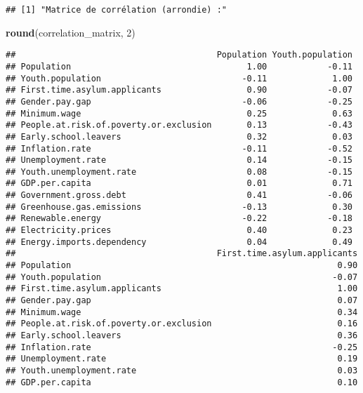 \documentclass[
]{article}
\newenvironment{Shaded}{\begin{snugshade}}{\end{snugshade}}
\newcommand{\DecValTok}[1]{\textcolor[rgb]{0.00,0.00,0.81}{#1}}
\newcommand{\FunctionTok}[1]{\textcolor[rgb]{0.13,0.29,0.53}{\textbf{#1}}}
\newcommand{\NormalTok}[1]{#1}
\begin{document}
\begin{verbatim}
## [1] "Matrice de corrélation (arrondie) :"
\end{verbatim}

\begin{Shaded}
\begin{Highlighting}[]
\FunctionTok{round}\NormalTok{(correlation\_matrix, }\DecValTok{2}\NormalTok{)}
\end{Highlighting}
\end{Shaded}

\begin{verbatim}
##                                        Population Youth.population
## Population                                   1.00            -0.11
## Youth.population                            -0.11             1.00
## First.time.asylum.applicants                 0.90            -0.07
## Gender.pay.gap                              -0.06            -0.25
## Minimum.wage                                 0.25             0.63
## People.at.risk.of.poverty.or.exclusion       0.13            -0.43
## Early.school.leavers                         0.32             0.03
## Inflation.rate                              -0.11            -0.52
## Unemployment.rate                            0.14            -0.15
## Youth.unemployment.rate                      0.08            -0.15
## GDP.per.capita                               0.01             0.71
## Government.gross.debt                        0.41            -0.06
## Greenhouse.gas.emissions                    -0.13             0.30
## Renewable.energy                            -0.22            -0.18
## Electricity.prices                           0.40             0.23
## Energy.imports.dependency                    0.04             0.49
##                                        First.time.asylum.applicants
## Population                                                     0.90
## Youth.population                                              -0.07
## First.time.asylum.applicants                                   1.00
## Gender.pay.gap                                                 0.07
## Minimum.wage                                                   0.34
## People.at.risk.of.poverty.or.exclusion                         0.16
## Early.school.leavers                                           0.36
## Inflation.rate                                                -0.25
## Unemployment.rate                                              0.19
## Youth.unemployment.rate                                        0.03
## GDP.per.capita                                                 0.10

\end{verbatim}
\end{document}
